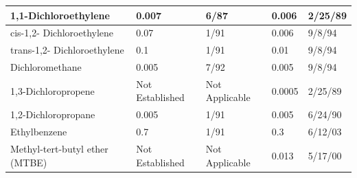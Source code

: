 \begin{table}
\begin{tabular}{|l|l|l|l|l|}
1,1-Dichloroethylene                                                       & 0.007             & 6/87                                                                                                              & 0.006            & 2/25/89                                          \\ \hline
cis-1,2-   Dichloroethylene                                                & 0.07              & 1/91                                                                                                              & 0.006            & 9/8/94                                           \\ \hline
trans-1,2-   Dichloroethylene                                              & 0.1               & 1/91                                                                                                              & 0.01             & 9/8/94                                           \\ \hline
Dichloromethane                                                            & 0.005             & 7/92                                                                                                              & 0.005            & 9/8/94                                           \\ \hline
1,3-Dichloropropene                                                        & Not   Established & Not   Applicable                                                                                                  & 0.0005           & 2/25/89                                          \\ \hline
1,2-Dichloropropane                                                        & 0.005             & 1/91                                                                                                              & 0.005            & 6/24/90                                          \\ \hline
Ethylbenzene                                                               & 0.7               & 1/91                                                                                                              & 0.3              & 6/12/03                                          \\ \hline
Methyl-tert-butyl   ether   (MTBE)                                         & Not   Established & Not   Applicable                                                                                                  & 0.013            & 5/17/00                                          \\ \hline

\end{tabular}
\end{table}
